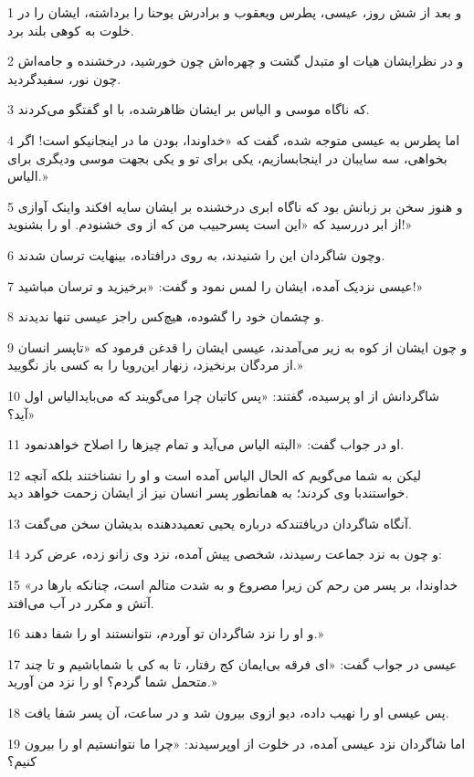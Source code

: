 \par 1 و بعد از شش روز، عیسی، پطرس ویعقوب و برادرش یوحنا را برداشته، ایشان را در خلوت به کوهی بلند برد.
\par 2 و در نظرایشان هیات او متبدل گشت و چهره‌اش چون خورشید، درخشنده و جامه‌اش چون نور، سفیدگردید.
\par 3 که ناگاه موسی و الیاس بر ایشان ظاهرشده، با او گفتگو می‌کردند.
\par 4 اما پطرس به عیسی متوجه شده، گفت که «خداوندا، بودن ما در اینجانیکو است! اگر بخواهی، سه سایبان در اینجابسازیم، یکی برای تو و یکی بجهت موسی ودیگری برای الیاس.»
\par 5 و هنوز سخن بر زبانش بود که ناگاه ابری درخشنده بر ایشان سایه افکند واینک آوازی از ابر در‌رسید که «این است پسرحبیب من که از وی خشنودم. او را بشنوید!»
\par 6 وچون شاگردان این را شنیدند، به روی در‌افتاده، بینهایت ترسان شدند.
\par 7 عیسی نزدیک آمده، ایشان را لمس نمود و گفت: «برخیزید و ترسان مباشید!»
\par 8 و چشمان خود را گشوده، هیچ‌کس راجز عیسی تنها ندیدند.
\par 9 و چون ایشان از کوه به زیر می‌آمدند، عیسی ایشان را قدغن فرمود که «تاپسر انسان از مردگان برنخیزد، زنهار این‌رویا را به کسی باز نگویید.»
\par 10 شاگردانش از او پرسیده، گفتند: «پس کاتبان چرا می‌گویند که می‌بایدالیاس اول آید؟»
\par 11 او در جواب گفت: «البته الیاس می‌آید و تمام چیزها را اصلاح خواهدنمود.
\par 12 لیکن به شما می‌گویم که الحال الیاس آمده است و او را نشناختند بلکه آنچه خواستندبا وی کردند؛ به همانطور پسر انسان نیز از ایشان زحمت خواهد دید.
\par 13 آنگاه شاگردان دریافتندکه درباره یحیی تعمیددهنده بدیشان سخن می‌گفت.
\par 14 و چون به نزد جماعت رسیدند، شخصی پیش آمده، نزد وی زانو زده، عرض کرد:
\par 15 «خداوندا، بر پسر من رحم کن زیرا مصروع و به شدت متالم است، چنانکه بارها در آتش و مکرر در آب می‌افتد.
\par 16 و او را نزد شاگردان تو آوردم، نتوانستند او را شفا دهند.»
\par 17 عیسی در جواب گفت: «ای فرقه بی‌ایمان کج رفتار، تا به کی با شماباشیم و تا چند متحمل شما گردم؟ او را نزد من آورید.»
\par 18 پس عیسی او را نهیب داده، دیو ازوی بیرون شد و در ساعت، آن پسر شفا یافت.
\par 19 اما شاگردان نزد عیسی آمده، در خلوت از اوپرسیدند: «چرا ما نتوانستیم او را بیرون کنیم؟
